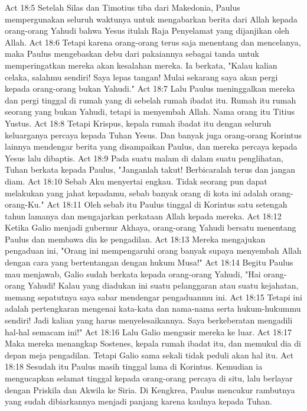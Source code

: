 Act 18:5  Setelah Silas dan Timotius tiba dari Makedonia, Paulus mempergunakan seluruh waktunya untuk mengabarkan berita dari Allah kepada orang-orang Yahudi bahwa Yesus itulah Raja Penyelamat yang dijanjikan oleh Allah.
Act 18:6  Tetapi karena orang-orang terus saja menentang dan mencelanya, maka Paulus mengebaskan debu dari pakaiannya sebagai tanda untuk memperingatkan mereka akan kesalahan mereka. Ia berkata, "Kalau kalian celaka, salahmu sendiri! Saya lepas tangan! Mulai sekarang saya akan pergi kepada orang-orang bukan Yahudi."
Act 18:7  Lalu Paulus meninggalkan mereka dan pergi tinggal di rumah yang di sebelah rumah ibadat itu. Rumah itu rumah seorang yang bukan Yahudi, tetapi ia menyembah Allah. Nama orang itu Titius Yustus.
Act 18:8  Tetapi Krispus, kepala rumah ibadat itu dengan seluruh keluarganya percaya kepada Tuhan Yesus. Dan banyak juga orang-orang Korintus lainnya mendengar berita yang disampaikan Paulus, dan mereka percaya kepada Yesus lalu dibaptis.
Act 18:9  Pada suatu malam di dalam suatu penglihatan, Tuhan berkata kepada Paulus, "Janganlah takut! Berbicaralah terus dan jangan diam.
Act 18:10  Sebab Aku menyertai engkau. Tidak seorang pun dapat melakukan yang jahat kepadamu, sebab banyak orang di kota ini adalah orang-orang-Ku."
Act 18:11  Oleh sebab itu Paulus tinggal di Korintus satu setengah tahun lamanya dan mengajarkan perkataan Allah kepada mereka.
Act 18:12  Ketika Galio menjadi gubernur Akhaya, orang-orang Yahudi bersatu menentang Paulus dan membawa dia ke pengadilan.
Act 18:13  Mereka mengajukan pengaduan ini, "Orang ini mempengaruhi orang banyak supaya menyembah Allah dengan cara yang bertentangan dengan hukum Musa!"
Act 18:14  Begitu Paulus mau menjawab, Galio sudah berkata kepada orang-orang Yahudi, "Hai orang-orang Yahudi! Kalau yang diadukan ini suatu pelanggaran atau suatu kejahatan, memang sepatutnya saya sabar mendengar pengaduanmu ini.
Act 18:15  Tetapi ini adalah pertengkaran mengenai kata-kata dan nama-nama serta hukum-hukummu sendiri! Jadi kalian yang harus menyelesaikannya. Saya berkeberatan mengadili hal-hal semacam ini!"
Act 18:16  Lalu Galio mengusir mereka ke luar.
Act 18:17  Maka mereka menangkap Sostenes, kepala rumah ibadat itu, dan memukul dia di depan meja pengadilan. Tetapi Galio sama sekali tidak peduli akan hal itu.
Act 18:18  Sesudah itu Paulus masih tinggal lama di Korintus. Kemudian ia mengucapkan selamat tinggal kepada orang-orang percaya di situ, lalu berlayar dengan Priskila dan Akwila ke Siria. Di Kengkrea, Paulus mencukur rambutnya yang sudah dibiarkannya menjadi panjang karena kaulnya kepada Tuhan.

